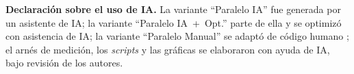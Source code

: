 \documentclass[12pt]{article}
\begin{document}
\bigskip
\noindent\textbf{Declaración sobre el uso de IA.} La variante ``Paralelo IA'' fue
generada por un asistente de IA; la variante ``Paralelo IA~+~Opt.'' parte de ella y
se optimizó con asistencia de IA; la variante ``Paralelo Manual'' se adaptó de
código humano \cite{githubconv}; el arnés de medición, los \emph{scripts} y las
gráficas se elaboraron con ayuda de IA, bajo revisión de los autores.
\end{document}
